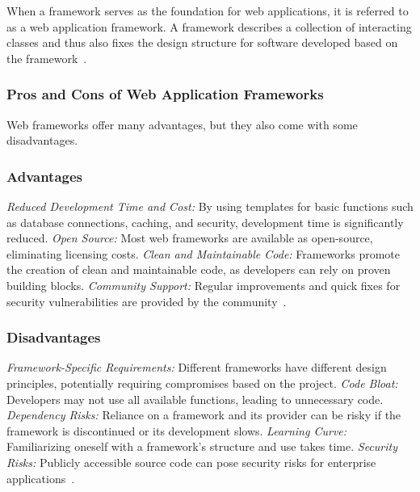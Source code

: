 \documentclass[conference]{IEEEtran}
\begin{document}
When a framework serves as the foundation for web applications, it is referred to as a web application framework. A framework describes a collection of interacting classes and thus also fixes the design structure for software developed based on the framework~\cite{ionos_webframeworks}.
\newline\subsubsection{Pros and Cons of Web Application Frameworks}
Web frameworks offer many advantages, but they also come with some disadvantages.
\newline\subsubsection{Advantages}
\textit{Reduced Development Time and Cost:} By using templates for basic functions such as database connections, caching, and security, development time is significantly reduced.
\newline\textit{Open Source:} Most web frameworks are available as open-source, eliminating licensing costs.
\newline\textit{Clean and Maintainable Code:} Frameworks promote the creation of clean and maintainable code, as developers can rely on proven building blocks.
\newline\newline\newline\textit{Community Support:} Regular improvements and quick fixes for security vulnerabilities are provided by the community~\cite{ionos_webframeworks}.
\newline
\subsubsection{Disadvantages}

\textit{Framework-Specific Requirements:} Different frameworks have different design principles, potentially requiring compromises based on the project.
\newline\textit{Code Bloat:} Developers may not use all available functions, leading to unnecessary code.
\newline\textit{Dependency Risks:} Reliance on a framework and its provider can be risky if the framework is discontinued or its development slows.
\newline\textit{Learning Curve:} Familiarizing oneself with a framework’s structure and use takes time.
\newline\textit{Security Risks:} Publicly accessible source code can pose security risks for enterprise applications~\cite{ionos_webframeworks}.
\newline
\end{document}
